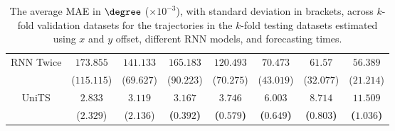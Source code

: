 \begin{table}[!ht]
{\begin{tabular}{|c|c|c|c|c|c|c|c|}
			\multirow{2}{*}{RNN Twice} & $173.855$ & $141.133$ & $165.183$ & $120.493$ & $70.473$ & $61.57$ & $56.389$ \\
			 & ($115.115$) & ($69.627$) & ($90.223$) & ($70.275$) & ($43.019$) & ($32.077$) & ($21.214$) \\ \hline
			\multirow{2}{*}{UniTS} & $2.833$ & $3.119$ & $\mathbf{3.167}$ & $\mathbf{3.746}$ & $\mathbf{6.003}$ & $\mathbf{8.714}$ & $\mathbf{11.509}$ \\
			 & ($2.329$) & ($2.136$) & \textbf{(}$\mathbf{0.392}$\textbf{)} & \textbf{(}$\mathbf{0.579}$\textbf{)} & \textbf{(}$\mathbf{0.649}$\textbf{)} & \textbf{(}$\mathbf{0.803}$\textbf{)} & \textbf{(}$\mathbf{1.036}$\textbf{)} \\ \hline
		\end{tabular}
	}
	\caption{The average MAE in $\degree$ ($\times 10^{-3}$), with standard deviation in brackets, across $k$-fold validation datasets for the trajectories in the $k$-fold testing datasets estimated using $x$ and $y$ offset, different RNN models, and forecasting times.}
	\label{tab:all_no_abs_MAE}
\end{table}